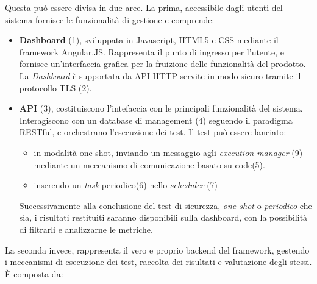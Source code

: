 \documentclass[../main.tex]{subfiles}
\begin{document}
Questa può essere divisa in due aree. La prima, accessibile dagli utenti del sistema fornisce le funzionalità di gestione e comprende:
\begin{itemize}
    \item \textbf{Dashboard} (1), sviluppata in Javascript, HTML5 e CSS mediante il framework Angular.JS. Rappresenta il punto di ingresso per l'utente, e fornisce un'interfaccia grafica per la fruizione delle funzionalità del prodotto. La \textit{Dashboard} è supportata da API HTTP servite in modo sicuro tramite il protocollo TLS (2).
    \item \textbf{API} (3), costituiscono l'intefaccia con le principali funzionalità del sistema. Interagiscono con un database di management (4) seguendo il paradigma RESTful, e orchestrano l'esecuzione dei test.
        Il test può essere lanciato:
        \begin{itemize}
            \item in modalità one-shot, inviando un messaggio agli \textit{execution manager} (9) mediante un meccanismo di comunicazione basato su code(5).
            \item inserendo un \textit{task} periodico(6) nello \textit{scheduler} (7)
        \end{itemize}
        Successivamente alla conclusione del test di sicurezza, \textit{one-shot} o \textit{periodico} che sia, i risultati restituiti saranno disponibili sulla dashboard, con la possibilità di filtrarli e analizzarne le metriche.
\end{itemize}
La seconda invece, rappresenta il vero e proprio backend del framework, gestendo i meccanismi di esecuzione dei test, raccolta dei risultati e valutazione degli stessi.
È composta da:
\end{document}
